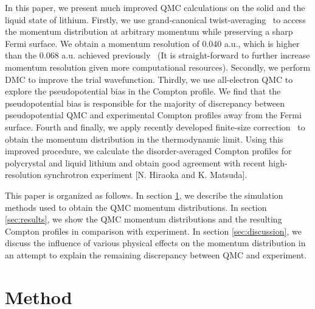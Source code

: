 \documentclass[aps,prb,showpacs,preprintnumbers,amsmath,amssymb,superscriptaddress,twocolumn]{revtex4-1}
\begin{document}
In this paper, we present much improved QMC calculations on the solid and the liquid state of lithium. Firstly, we use grand-canonical twist-averaging~\cite{Lin2001} to access the momentum distribution at arbitrary momentum while preserving a sharp Fermi surface. We obtain a momentum resolution of 0.040 a.u., which is higher than the 0.068 a.u. achieved previously~\cite{Filippi1999} (It is straight-forward to further increase momentum resolution given more computational resources). Secondly, we perform DMC to improve the trial wavefunction. Thirdly, we use all-electron QMC to explore the pseudopotential bias in the Compton profile. We find that the pseudopotential bias is responsible for the majority of discrepancy between pseudopotential QMC and experimental Compton profiles away from the Fermi surface. Fourth and finally, we apply recently developed finite-size correction~\cite{Holzmann2009,Holzmann2011} to obtain the momentum distribution in the thermodynamic limit. Using this improved procedure, we calculate the disorder-averaged Compton profiles for polycrystal and liquid lithium and obtain good agreement with recent high-resolution synchrotron experiment [N. Hiraoka and K. Matsuda].

This paper is organized as follows. In section \ref{sec:method}, we describe the simulation methods used to obtain the QMC momentum distributions. In section \ref{sec:results}, we show the QMC momentum distributions and the resulting Compton profiles in comparison with experiment. In section \ref{sec:discussion}, we discuss the influence of various physical effects on the momentum distribution in an attempt to explain the remaining discrepancy between QMC and experiment.

\section{Method} \label{sec:method}
\end{document}
